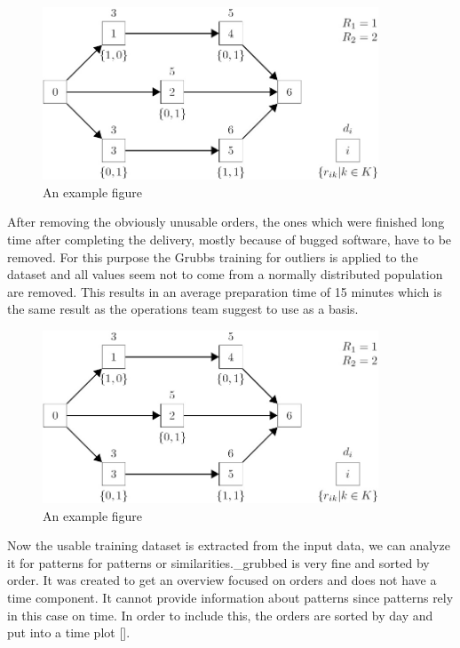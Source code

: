 \begin{figure}[h]
\begin{center}
\includegraphics[width=10cm]{images/example_figure}
\caption{An example figure}
\label{fig:example}
\end{center}
\end{figure}

After removing the obviously unusable orders, the ones which were finished long time after completing the delivery, mostly because of bugged software, have to be removed. For this purpose the Grubbs training for outliers is applied to the dataset and all values seem not to come from a normally distributed population are removed. This results in an average preparation time of 15 minutes which is the same result as the operations team suggest to use as a basis.

\begin{figure}[h]
\begin{center}
\includegraphics[width=10cm]{images/example_figure}
\caption{An example figure}
\label{fig:example}
\end{center}
\end{figure}

Now the usable training dataset is extracted from the input data, we can analyze it for patterns for patterns or similarities._grubbed is very fine and sorted by order. It was created to get an overview focused on orders and does not have a time component. It cannot provide information about patterns since patterns rely in this case on time. In order to include this, the orders are sorted by day and put into a time plot [].

